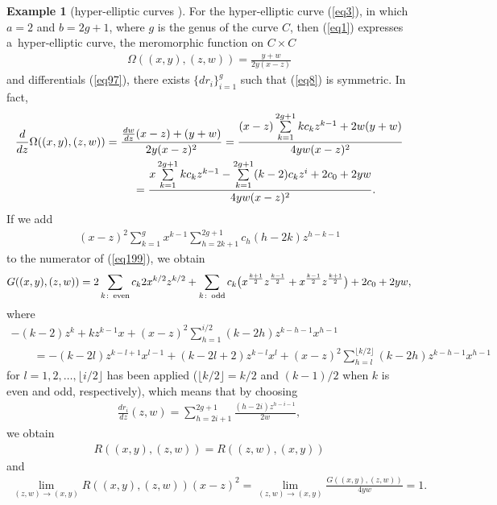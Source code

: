 \documentclass[pdftex]{sigma}
\numberwithin{equation}{section}
\theoremstyle{definition}
\newtheorem{rei}[teiri]{Example}
\begin{document}
\begin{rei}[hyper-elliptic curves \cite{CC,EE}] For the hyper-elliptic curve (\ref{eq3}), in which $a=2$ and $b=2g+1$, where $g$ is the genus of the curve $C$, then (\ref{eq1}) expresses a~hyper-elliptic curve, the meromorphic function on $C\times C$
\begin{gather*}\Omega((x,y),(z,w))=\frac{y+w}{2y(x-z)}\end{gather*}
and dif\/ferentials (\ref{eq97}), there exists $\{dr_{i}\}_{i=1}^g$ such that (\ref{eq8}) is symmetric. In fact,
\begin{gather}
\frac{d}{dz}\Omega((x,y),(z,w))=\frac{ \frac{dw}{dz}(x-z)+(y+w)}{2y(x-z)^2}=\frac{(x-z)\sum\limits_{k=1}^{2g+1}kc_kz^{k-1}+2w(y+w)}{4yw(x-z)^2}\nonumber\\
\hphantom{\frac{d}{dz}\Omega((x,y),(z,w))}{} =
\frac{ x\sum\limits_{k=1}^{2g+1}kc_kz^{k-1}-\sum\limits_{k=1}^{2g+1}(k-2)c_kz^i+2c_0+2yw}{4yw(x-z)^2}.\label{eq199}
\end{gather}
If we add
\begin{gather*}(x-z)^2\sum_{k=1}^gx^{k-1}\sum_{h=2k+1}^{2g+1}c_h(h-2k)z^{h-k-1}\end{gather*}
to the numerator of (\ref{eq199}), we obtain
\begin{gather*}G((x,y),(z,w))=2\sum_{k\colon \, {\rm even}}c_k2x^{k/2}z^{k/2}+\sum_{k\colon \, {\rm odd}} c_k\big(x^{\frac{k+1}{2}}z^{\frac{k-1}{2}}+x^{\frac{k-1}{2}}z^{\frac{k+1}{2}}\big) +2c_0+2yw,
\end{gather*}
where
\begin{gather*}
-(k-2)z^k+kz^{k-1}x+(x-z)^2\sum_{h=1}^{i/2}(k-2h)z^{k-h-1}x^{h-1}\\
\qquad{} =-(k-2l)z^{k-l+1}x^{l-1}+(k-2l+2)z^{k-l}x^l+(x-z)^2\sum_{h=l}^{\lfloor k/2\rfloor }(k-2h)z^{k-h-1}x^{h-1}
\end{gather*}
for $l=1,2,\dots,\lfloor i/2 \rfloor$ has been applied ($\lfloor k/2 \rfloor=k/2$ and $(k-1)/2$ when $k$ is even and odd, respectively), which means that by choosing
\begin{gather*}\frac{dr_i}{dz}(z,w)=\sum_{h=2i+1}^{2g+1}\frac{(h-2i)z^{h-i-1}}{2w},\end{gather*}
we obtain
\begin{gather*}R((x,y),(z,w))=R((z,w),(x,y))\end{gather*}
and
\begin{gather*}\lim_{(z,w)\rightarrow (x,y)}R((x,y),(z,w))(x-z)^2=\lim_{(z,w)\rightarrow (x,y)}\frac{G((x,y),(z,w))}{4yw}=1.\end{gather*}
\end{rei}
\end{document}
